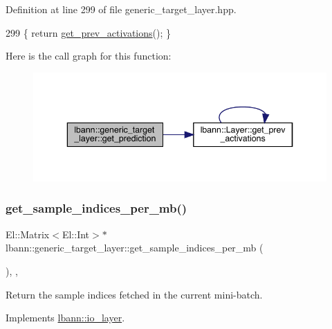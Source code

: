 Definition at line 299 of file generic\+\_\+target\+\_\+layer.\+hpp.


\begin{DoxyCode}
299 \{ \textcolor{keywordflow}{return} \hyperlink{classlbann_1_1Layer_a45853df73a2e72bfaa774665a0f37ed7}{get\_prev\_activations}(); \}
\end{DoxyCode}
Here is the call graph for this function\+:\nopagebreak
\begin{figure}[H]
\begin{center}
\leavevmode
\includegraphics[width=343pt]{classlbann_1_1generic__target__layer_a35de513f32f2db03587623d09ca3d3c9_cgraph}
\end{center}
\end{figure}
\mbox{\label{classlbann_1_1generic__target__layer_a9673d3fb3db6ecaae979886178b785ea}} 
\subsubsection{\texorpdfstring{get\+\_\+sample\+\_\+indices\+\_\+per\+\_\+mb()}{get\_sample\_indices\_per\_mb()}}
{\footnotesize\ttfamily El\+::\+Matrix$<$El\+::\+Int$>$$\ast$ lbann\+::generic\+\_\+target\+\_\+layer\+::get\+\_\+sample\+\_\+indices\+\_\+per\+\_\+mb (\begin{DoxyParamCaption}{ }\end{DoxyParamCaption})\hspace{0.3cm}{\ttfamily [inline]}, {\ttfamily [override]}, {\ttfamily [virtual]}}

Return the sample indices fetched in the current mini-\/batch. 

Implements \hyperlink{classlbann_1_1io__layer_ab319ad5697e002072ee03e8c64523fb5}{lbann\+::io\+\_\+layer}.



